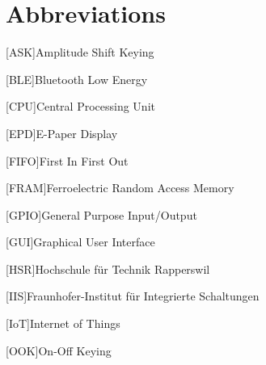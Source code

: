 \chapter*{Abbreviations}
\begin{acronym}
	[ASK]{Amplitude Shift Keying}
\end{acronym}

\begin{acronym}
	[BLE]{Bluetooth Low Energy}
\end{acronym}

\begin{acronym}
	[CPU]{Central Processing Unit}
\end{acronym}

\begin{acronym}
	[EPD]{E-Paper Display}
\end{acronym}

\begin{acronym}
	[FIFO]{First In First Out}
\end{acronym}

\begin{acronym}
	[FRAM]{Ferroelectric Random Access Memory}
\end{acronym}

\begin{acronym}
	[GPIO]{General Purpose Input/Output}
\end{acronym}

\begin{acronym}
	[GUI]{Graphical User Interface}
\end{acronym}

\begin{acronym}
	[HSR]{Hochschule für Technik Rapperswil}
\end{acronym}

\begin{acronym}
	[IIS]{Fraunhofer-Institut für Integrierte Schaltungen}
\end{acronym}

\begin{acronym}
	[IoT]{Internet of Things}
\end{acronym}

\begin{acronym}
	[OOK]{On-Off Keying}
\end{acronym}

